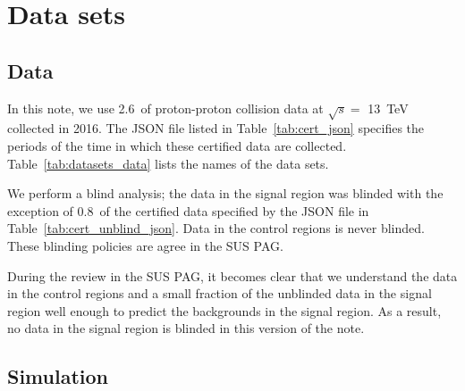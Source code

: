 \section{Data sets}
\label{sec:datasets}

\subsection{Data}


In this note, we use 2.6~\ifb of proton-proton collision data at
$\sqrt{s} =$ 13~TeV collected in 2016. The JSON file listed in
Table~\ref{tab:cert_json} specifies the periods of the time in which
these certified data are collected. Table~\ref{tab:datasets_data} lists
the names of the data sets.

We perform a blind analysis; the data in the signal region was blinded
with the exception of 0.8~\ifb of the certified data specified by the
JSON file in Table~\ref{tab:cert_unblind_json}. Data in the control
regions is never blinded. These blinding policies are agree in the SUS
PAG.

During the review in the SUS PAG, it becomes clear that we understand
the data in the control regions and a small fraction of the unblinded
data in the signal region well enough to predict the backgrounds in
the signal region. As a result, no data in the signal region is
blinded in this version of the note.

\begin{table}[!h]
 \footnotesize
 \label{tab:cert_json}
\end{table}

\begin{table}[!h]
\footnotesize 
\label{tab:datasets_data}
\end{table}

\begin{table}[!h]
 \footnotesize

\label{tab:cert_unblind_json}
\end{table}

\subsection{Simulation}

